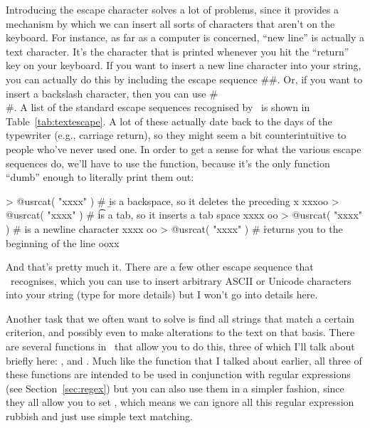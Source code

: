 Introducing the escape character solves a lot of problems, since it provides a mechanism by which we can insert all sorts of characters that aren't on the keyboard. For instance, as far as a computer is concerned, ``new line'' is actually a text character. It's the character that is printed whenever you hit the ``return'' key on your keyboard. If you want to insert a new line character into your string, you can actually do this by including the escape sequence \rtextverb#\n#. Or, if you want to insert a backslash character, then you can use \rtextverb#\\#. A list of the standard escape sequences recognised by \R\ is shown in Table~\ref{tab:textescape}. A lot of these actually date back to the days of the typewriter (e.g., carriage return), so they might seem a bit counterintuitive to people who've never used one. In order to get a sense for what the various escape sequences do, we'll have to use the  function, because it's the only function ``dumb'' enough to literally print them out:
\begin{rblock1}
> @usr{cat( "xxxx\boo" )}  # \b is a backspace, so it deletes the preceding x
xxxoo
> @usr{cat( "xxxx\too" )}  # \t is a tab, so it inserts a tab space
xxxx	oo
> @usr{cat( "xxxx\noo" )}  # \n is a newline character
xxxx
oo
> @usr{cat( "xxxx\roo" )}  # \r returns you to the beginning of the line
ooxx
\end{rblock1}
And that's pretty much it. There are a few other escape sequence that \R\ recognises, which you can use to insert arbitrary ASCII or Unicode characters into your string (type  for more details) but I won't go into details here.



Another task that we often want to solve is find all strings that match a certain criterion, and possibly even to make alterations to the text on that basis. There are several functions in \R\ that allow you to do this, three of which I'll talk about briefly here: ,  and . Much like the  function that I talked about earlier, all three of these functions are intended to be used in conjunction with regular expressions (see Section~\ref{sec:regex}) but you can also use them in a simpler fashion, since they all allow you to set , which means we can ignore all this regular expression rubbish and just use simple text matching.

